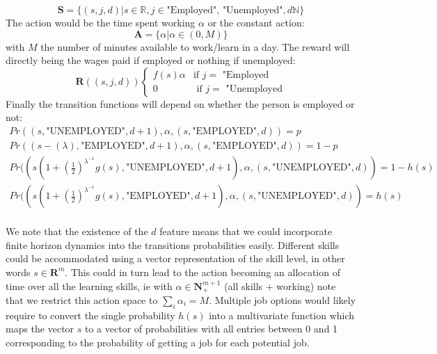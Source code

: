 \documentclass{article}[12pt]
\begin{document}
$$ \mathbf{S} = \{(s,j,d) | s\in \mathbb{R}, j \in \text{"Employed", "Unemployed"}, d\mathbb{N}\} $$
The action would be the time spent working $\alpha$ or the constant action:
$$ \mathbf{A} = \{\alpha | \alpha\in (0,M)\}$$
with $M$ the number of minutes available to work/learn in a day.
The reward will directly being the wages paid if employed or nothing if unemployed:
$$\mathbf{R}((s,j,d)) \begin{cases} f(s)\alpha& \text{if $j =$ "Employed}\\ 0 & \text{ if $j =$ "Unemployed}\end{cases} $$
Finally the transition functions will depend on whether the person is employed or not:
\begin{align*}
Pr((s,\text{"UNEMPLOYED"},d+1),\alpha, (s,\text{"EMPLOYED"},d)) = p\\
Pr((s-(\lambda),\text{"EMPLOYED"},d+1),\alpha, (s,\text{"EMPLOYED"},d)) = 1-p\\
Pr((s(1+(\frac{1}{2})^{\lambda^{-1}} g(s),\text{"UNEMPLOYED"},d+1),\alpha, (s,\text{"UNEMPLOYED"},d)) = 1-h(s)\\
Pr((s(1+(\frac{1}{2})^{\lambda^{-1}} g(s),\text{"EMPLOYED"},d+1),\alpha, (s, \text{"UNEMPLOYED"},d)) = h(s)\\
\end{align*}
 
 
 We note that the existence of the $d$ feature means that we could incorporate finite horizon dynamics into the transitions probabilities easily. Different skills could be accommodated using a vector representation of the skill level, in other words $s \in \mathbf{R}^{m}$. This could in turn lead to the action becoming an allocation of time over all the learning skills, ie with $\alpha \in \mathbf{N}_+^{m+1}$ (all skills + working) note that we restrict this action space to $\sum_i \alpha_i = M$. Multiple job options would likely require to convert the single probability $h(s)$ into a multivariate function which maps the vector $s$ to a vector of probabilities with all entries between 0 and 1 corresponding to the probability of getting a job for each potential job. 
\end{document}
